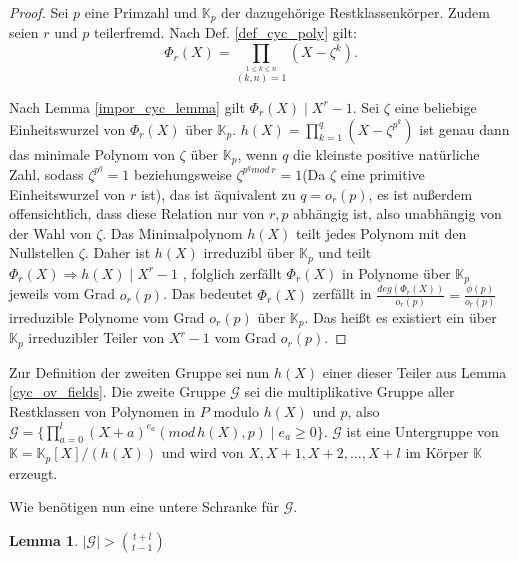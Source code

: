 \documentclass[12pt,oneside]{article}
\newtheorem{lemma}[theorem]{Lemma}
\theoremstyle{remark}
\theoremstyle{definition}
\begin{document}
\begin{proof}
    Sei $p$ eine Primzahl und $\mathbb{K}_{p}$ der dazugehörige Restklassenkörper. Zudem seien $r$ und $p$ teilerfremd. Nach Def. \ref{def_cyc_poly} gilt: 
    \begin{equation}\label{rth_cy}
        \Phi _{r}(X)=\prod _{\stackrel {1\leq k\leq n}{(k,n)=1}}\left(X- \zeta^k\right).
    \end{equation}
    
Nach Lemma \ref{impor_cyc_lemma} gilt $\Phi_{r}(X) \mid  X^{r} - 1$. Sei $\zeta$ eine beliebige Einheitswurzel von $\Phi_r(X)$  über $\mathbb{K}_p$. $h(X) = \prod_{k = 1}^{q} (X - \zeta^{p^k})$ ist genau dann das minimale Polynom von $\zeta$ über $\mathbb{K}_p$, wenn $q$ die kleinste positive natürliche Zahl, sodass $\zeta^{p^q} = 1$ beziehungsweise $\zeta^{p^q mod \, r} = 1$(Da $\zeta$ eine primitive Einheitswurzel von $r$ ist), das ist äquivalent zu $q = o_r(p)$, es ist außerdem offensichtlich, dass diese Relation nur von $r,p$ abhängig ist, also unabhängig von der Wahl von $\zeta$. Das Minimalpolynom $h(X)$ teilt jedes Polynom mit den Nullstellen $\zeta$. Daher ist $h(X)$ irreduzibl über $\mathbb{K}_p$ und teilt $\Phi_{r}(X) \Rightarrow h(X) \mid X^r - 1$ , folglich zerfällt $\Phi_r(X)$ in Polynome über $\mathbb{K}_p$ jeweils vom Grad $o_r(p)$. Das bedeutet $\Phi_{r}(X)$ zerfällt in $\frac{deg(\Phi_{r}(X))}{o_r(p)} = \frac{\phi(p)}{o_r(p)}$ irreduzible Polynome vom Grad $o_r(p)$ über $\mathbb{K}_p$. Das heißt es existiert ein über $\mathbb{K}_p$ irreduzibler Teiler von $X^r - 1$ vom Grad $o_r(p)$.              
\end{proof}

Zur Definition der zweiten Gruppe sei nun $h(X)$ einer dieser Teiler aus Lemma \ref{cyc_ov_fields}. Die zweite Gruppe $\mathcal{G}$ sei die multiplikative Gruppe aller Restklassen von Polynomen in $P$ modulo $h(X)$ und $p$, also $\mathcal{G} = \{ \prod_{a = 0}^{l} (X + a)^{e_{a}} (mod \, h(X), p) \mid e_{a} \geq 0 \}$. $\mathcal{G}$ ist eine Untergruppe von $\mathbb{K} = \mathbb{K}_p[X] / (h(X))$ und wird von $X,X+1,X+2, ..., X + l $ im Körper $\mathbb{K}$ erzeugt.\newline

Wie benötigen nun eine untere Schranke für $\mathcal{G}$.

\begin{lemma}\label{lemma47}
$|\mathcal{G}| > {t + l \choose t - 1}$
\end{lemma}
\end{document}
